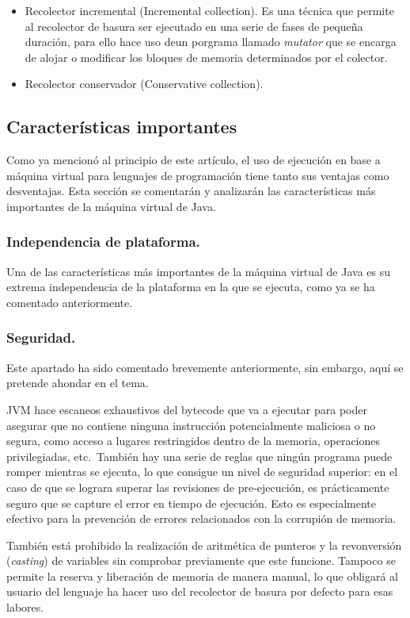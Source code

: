 \documentclass[english,runningheads,a4paper]{llncs}[2018/03/10]
\begin{document}
{\begin{itemize}
\begin{itemize}
        \item Recolector incremental (Incremental collection). Es una técnica que permite al recolector de basura ser ejecutado en una serie de fases de pequeña duración, para ello hace uso deun porgrama llamado \textit{mutator} que se encarga de alojar o modificar los bloques de memoria determinados por el colector.
        \item Recolector conservador (Conservative collection).
    \end{itemize}
\end{itemize}

\subsection{Características importantes}
Como ya mencionó al principio de este artículo, el uso de ejecución en base a
máquina virtual para lenguajes de programación tiene tanto sus ventajas como
desventajas. Esta sección se comentarán y analizarán las características más
importantes de la máquina virtual de Java.

\subsubsection*{Independencia de plataforma.}
Una de las características más importantes de la máquina virtual de Java es su
extrema independencia de la plataforma en la que se ejecuta, como ya se ha comentado anteriormente. 


\subsubsection*{Seguridad.}
Este apartado ha sido comentado brevemente anteriormente, sin embargo, aquí se pretende ahondar en el tema.

JVM hace escaneos exhaustivos del bytecode que va a ejecutar
para poder asegurar que no contiene ninguna instrucción potencialmente
maliciosa o no segura, como acceso a lugares restringidos dentro de la memoria,
operaciones privilegiadas, etc.\ También hay una serie de reglas que ningún
programa puede romper mientras se ejecuta, lo que consigue un nivel de seguridad
superior: en el caso de que se lograra superar las revisiones de pre-ejecución, es
prácticamente seguro que se capture el error en tiempo de ejecución. Esto es
especialmente efectivo para la prevención de errores relacionados con la
corrupión de memoria.

También está prohibido la realización de aritmética de punteros y la revonversión (\textit{casting}) de
variables sin comprobar previamente que este funcione. Tampoco se permite la
reserva y liberación de memoria de manera manual, lo que obligará al usuario del lenguaje ha hacer uso del recolector de basura por defecto para esas labores.

}
\end{document}
